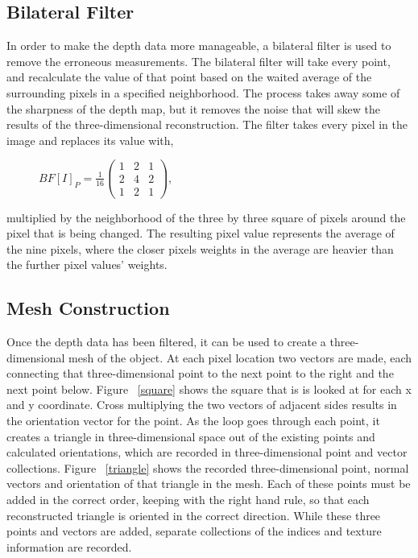 \documentclass[pdftex,10.5pt]{report}
\begin{document}
\subsection{Bilateral Filter}
In order to make the depth data more manageable, a bilateral filter is used to remove the erroneous measurements. The bilateral filter will take every point, and recalculate the value of that point based on the waited average of the surrounding pixels in a specified neighborhood. The process takes away some of the sharpness of the depth map, but it removes the noise that will skew the results of the three-dimensional reconstruction. The filter takes every pixel in the image and replaces its value with,
\begin{figure}[H]
	\centering
	$BF[I]_{P} = \frac{1}{16} \left( 
	\begin{array}{ccc}
		1 & 2 & 1 \\
		2 & 4 & 2 \\
		1 & 2 & 1 
	\end{array}  \right)$,
\end{figure}
\noindent multiplied by the neighborhood of the three by three square of pixels around the pixel that is being changed. The resulting pixel value represents the average of the nine pixels, where the closer pixels weights in the average are heavier than the further pixel values' weights.  \cite{filter}

\subsection{Mesh Construction}
Once the depth data has been filtered, it can be used to create a three-dimensional mesh of the object. At each pixel location two vectors are made, each connecting that three-dimensional point to the next point to the right and the next point below. Figure ~\ref{square} shows the square that is is looked at for each x and y coordinate. Cross multiplying the two vectors of adjacent sides results in the orientation vector for the point. As the loop goes through each point, it creates a triangle in three-dimensional space out of the existing points and calculated orientations, which are recorded in three-dimensional point and vector collections. Figure ~\ref{triangle} shows the recorded three-dimensional point, normal vectors and orientation of that triangle in the mesh. Each of these points must be added in the correct order, keeping with the right hand rule, so that each reconstructed triangle is oriented in the correct direction. While these three points and vectors are added, separate collections of the indices and texture information are recorded. 
\end{document}
